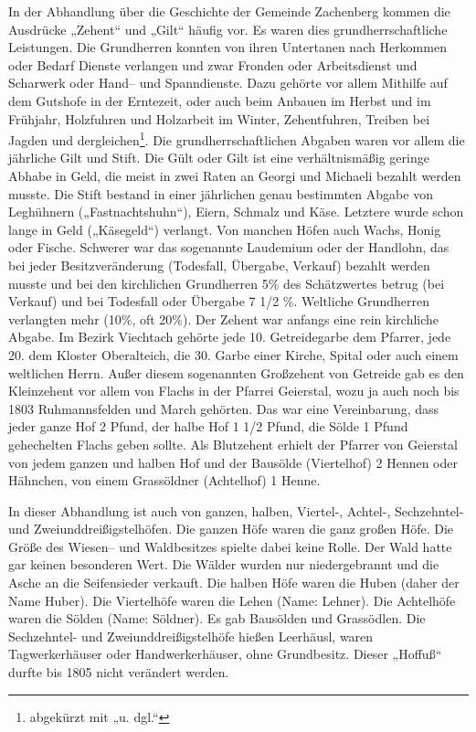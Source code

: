 \documentclass[12pt,a4pager,draft]{book}
\begin{document}
In der Abhandlung über die Geschichte der Gemeinde Zachenberg kommen die
Ausdrücke „Zehent“ und „Gilt“ häufig vor. Es waren dies grundherrschaftliche
Leistungen. Die Grundherren konnten von ihren Untertanen nach Herkommen oder
Bedarf Dienste verlangen und zwar Fronden oder Arbeitsdienst und Scharwerk oder
Hand– und Spanndienste. Dazu gehörte vor allem Mithilfe auf dem Gutshofe in der
Erntezeit, oder auch beim Anbauen im Herbst und im Frühjahr, Holzfuhren und
Holzarbeit im Winter, Zehentfuhren, Treiben bei Jagden und
dergleichen\footnote{abgekürzt mit „u. dgl.“}. Die grundherrschaftlichen Abgaben
waren vor allem die jährliche Gilt und Stift. Die Gült oder Gilt ist eine
verhältnismäßig geringe Abhabe in Geld, die meist in zwei Raten an Georgi und
Michaeli bezahlt werden musste. Die Stift bestand in einer jährlichen genau
bestimmten Abgabe von Leghühnern („Fastnachtshuhn“), Eiern, Schmalz und Käse.
Letztere wurde schon lange in Geld („Käsegeld“) verlangt. Von manchen Höfen auch
Wachs, Honig oder Fische. Schwerer war das sogenannte Laudemium oder der
Handlohn, das bei jeder Besitzveränderung (Todesfall, Übergabe, Verkauf) bezahlt
werden musste und bei den kirchlichen Grundherren 5\% des Schätzwertes betrug
(bei Verkauf) und bei Todesfall oder Übergabe 7 1/2 \%. Weltliche Grundherren
verlangten mehr (10\%, oft 20\%). Der Zehent war anfangs eine rein kirchliche
Abgabe. Im Bezirk Viechtach gehörte jede
10. Getreidegarbe dem Pfarrer, jede 20. dem Kloster Oberalteich, die 30. Garbe
einer Kirche, Spital oder auch einem weltlichen Herrn. Außer diesem sogenannten
Großzehent von Getreide gab es den Kleinzehent vor allem von Flachs in der
Pfarrei Geierstal, wozu ja auch noch bis 1803 Ruhmannsfelden und March gehörten.
Das war eine Vereinbarung, dass jeder ganze Hof 2 Pfund, der halbe Hof 1 1/2
Pfund, die Sölde 1 Pfund gehechelten Flachs geben sollte. Als Blutzehent erhielt
der Pfarrer von Geierstal von jedem ganzen und halben Hof und der Bausölde
(Viertelhof) 2 Hennen oder Hähnchen, von einem Grassöldner (Achtelhof) 1 Henne.

In dieser Abhandlung ist auch von ganzen, halben, Viertel-, Achtel-,
Sechzehntel- und Zweiunddreißigstelhöfen. Die ganzen Höfe waren die ganz großen
Höfe. Die Größe des Wiesen– und Waldbesitzes spielte dabei keine Rolle. Der Wald
hatte gar keinen besonderen Wert. Die Wälder wurden nur niedergebrannt und die
Asche an die Seifensieder verkauft. Die halben Höfe waren die Huben (daher der
Name Huber). Die Viertelhöfe waren die Lehen (Name: Lehner). Die Achtelhöfe
waren die Sölden (Name: Söldner). Es gab Bausölden und Grassödlen. Die
Sechzehntel- und Zweiunddreißigstelhöfe hießen Leerhäusl, waren Tagwerkerhäuser
oder Handwerkerhäuser, ohne Grundbesitz. Dieser „Hoffuß“ durfte bis 1805 nicht
verändert werden.
\end{document}
